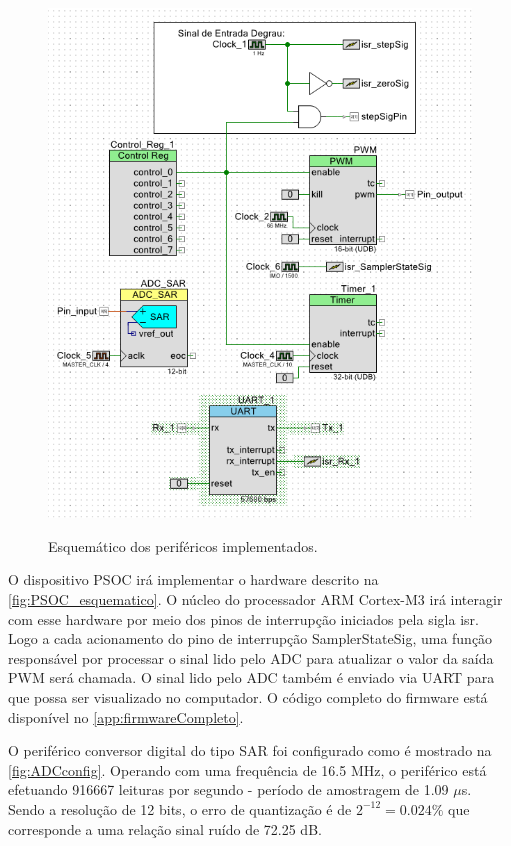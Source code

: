 \documentclass[
	article,			%
	11pt,				%
	oneside,			%
	a4paper,			%
	english,			%
	brazil,				%
	sumario=tradicional
	]{abntex2}
\begin{document}
\begin{figure}[htb!]
	\centering
	\caption{Esquemático dos periféricos implementados.}
	\includegraphics[scale=0.85]{./img/PSOC_esquematico.PNG}
	\label{fig:PSOC_esquematico}
\end{figure}

O dispositivo PSOC irá implementar o hardware descrito na \autoref{fig:PSOC_esquematico}. O núcleo do processador ARM Cortex-M3 irá interagir com esse hardware por meio dos pinos de interrupção iniciados pela sigla isr. 
Logo a cada acionamento do pino de interrupção SamplerStateSig, uma função responsável por processar o sinal lido pelo ADC para atualizar o valor da saída PWM será chamada.
O sinal lido pelo ADC também é enviado via UART para que possa ser visualizado no computador.
O código completo do firmware está disponível no \autoref{app:firmwareCompleto}.

\pagebreak

O periférico conversor digital do tipo SAR foi configurado como é mostrado na \autoref{fig:ADCconfig}.
Operando com uma frequência de 16.5 MHz, o periférico está efetuando 916667 leituras por segundo - período de amostragem de 1.09 $\mu$s. 
Sendo a resolução de 12 bits, o erro de quantização é de $2^{-12} = 0.024\%$ que corresponde a uma relação sinal ruído de 72.25 dB.
\end{document}
